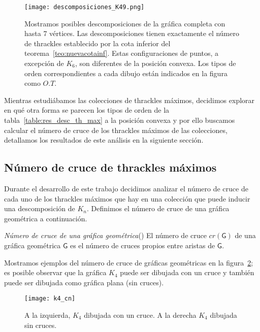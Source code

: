   \begin{figure}[htpb]
    \centering
    \texttt{[image: descomposiciones\_K49.png]}
    \caption{Mostramos posibles descomposiciones de la gráfica completa con
    hasta 7 vértices. Las descomposiciones tienen exactamente el número de
    thrackles establecido por la cota inferior del
    teorema~\ref{teo:nuevacotainf}. Estas configuraciones de puntos, a excepción de $K_6$, son
    diferentes de la posición convexa. Los tipos de orden correspondientes a cada dibujo están
    indicados en la figura como $O.T.$}
    \label{fig:descomposicionesk4_k9}
  \end{figure}

  Mientras estudiábamos las colecciones de thrackles máximos, decidimos explorar en qué otra forma
  se parecen los tipos de orden de la tabla~\ref{table:res_desc_th_max} a la posición convexa y por
  ello buscamos calcular el número de cruce de los thrackles máximos de las colecciones, detallamos
  los resultados de este análisis en la siguiente sección.

  \subsection{Número de cruce de thrackles máximos }\label{secc:cnthracklemax}

    Durante el desarrollo de este trabajo decidimos analizar el número de cruce
    de cada uno de los thrackles máximos que hay en una colección que puede inducir una
    descomposición de $K_n$. Definimos el número de cruce de una gráfica geométrica a continuación.

    \begin{definition}{\emph{Número de cruce de una gráfica geométrica}(\cite{Schaefer2018})}
      El número de cruce $cr(\mathsf{G})$ de una gráfica geométrica $\mathsf{G}$
      es el número de cruces propios entre aristas de $\mathsf{G}$.
    \end{definition}

    Mostramos ejemplos del número de cruce de gráficas geométricas en la
    figura~\ref{fig:k4_cn}; es posible observar que la gráfica $K_4$ puede ser dibujada con
    un cruce y también puede ser dibujada como gráfica plana (sin cruces).
    \begin{figure}[h]
      \centering
      \texttt{[image: k4\_cn]}
      \caption{A la izquierda, $K_4$ dibujada con un cruce. A la derecha $K_4$ dibujada sin
      cruces.}
      \label{fig:k4_cn}
    \end{figure}

